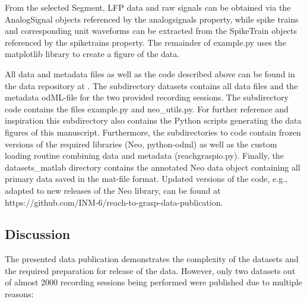 From the selected Segment, LFP data and raw signals can be obtained via the AnalogSignal objects referenced by the analogsignals property, while spike trains and corresponding unit waveforms can be extracted from the SpikeTrain objects referenced by the spiketrains property. The remainder of example.py uses the matplotlib library to create a figure of the data.

All data and metadata files as well as the code described above can be found in the data repository at . The subdirectory datasets contains all data files and the metadata odML-file for the two provided recording sessions. The subdirectory code contains the files example.py and neo\_utils.py. For further reference and inspiration this subdirectory also contains the Python scripts generating the data figures of this manuscript. Furthermore, the subdirectories to code contain frozen versions of the required libraries (Neo, python-odml) as well as the custom loading routine combining data and metadata (reachgraspio.py). Finally, the datasets\_matlab directory contains the annotated Neo data object containing all primary data saved in the mat-file format. Updated versions of the code, e.g., adapted to new releases of the Neo library, can be found at https://github.com/INM-6/reach-to-grasp-data-publication.




\subsection{Discussion}
The presented data publication demonstrates the complexity of the datasets and the required preparation for release of the data. However, only two datasets out of almost 2000 recording sessions being performed were published due to multiple reasons:

